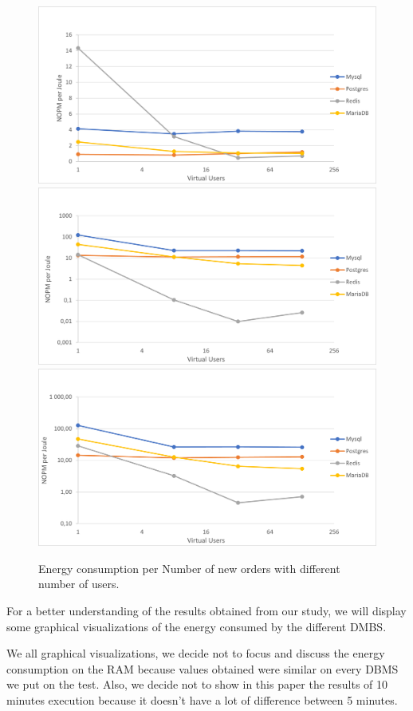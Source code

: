 \begin{figure}[h!]
\centering
\caption{Energy consumption per Number of new orders with different number of users.}
\includegraphics[width=0.76\columnwidth]{results/vu/Packgage-nopm.png}
\includegraphics[width=0.76\columnwidth]{results/vu/Disk-nopm.png}
\includegraphics[width=0.76\columnwidth]{results/vu/Total-nopm.png}
\label{fig:vuyenergynopm}	
\end{figure}

For a better understanding of the results obtained from our study, we will display some graphical visualizations of the energy consumed by the different DMBS.

We all graphical visualizations, we decide not to focus and discuss the energy consumption on the RAM because values obtained were similar on every DBMS we put on the test. Also, we decide not to show in this paper the results of 10 minutes execution because it doesn't have a lot of difference between 5 minutes.

